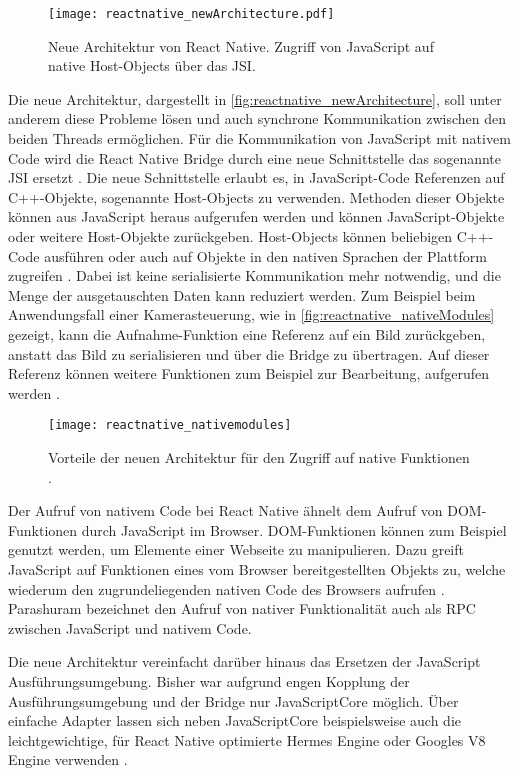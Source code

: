 \begin{figure}[ht]
  \centering
  \texttt{[image: reactnative\_newArchitecture.pdf]}
  \caption{Neue Architektur von React Native. Zugriff von JavaScript auf native Host-Objects über das \ac{JSI}.}
  \label{fig:reactnative_newArchitecture}
\end{figure}
Die neue Architektur, dargestellt in \autoref{fig:reactnative_newArchitecture}, soll unter anderem diese Probleme lösen und auch synchrone Kommunikation zwischen den beiden Threads ermöglichen.
Für die Kommunikation von JavaScript mit nativem Code wird die React Native Bridge durch eine neue Schnittstelle das sogenannte \ac{JSI} ersetzt \cite{Cook_ReactNativeBridge}.
Die neue Schnittstelle erlaubt es, in JavaScript-Code Referenzen auf C++-Objekte, sogenannte Host-Objects zu verwenden.
Methoden dieser Objekte können aus JavaScript heraus aufgerufen werden und können JavaScript-Objekte oder weitere Host-Objekte zurückgeben.
Host-Objects können beliebigen C++-Code ausführen oder auch auf Objekte in den nativen Sprachen der Plattform zugreifen \cite{Parashuram_React}.
Dabei ist keine serialisierte Kommunikation mehr notwendig, und die Menge der ausgetauschten Daten kann reduziert werden.
Zum Beispiel beim Anwendungsfall einer Kamerasteuerung, wie in \autoref{fig:reactnative_nativeModules} gezeigt, kann die Aufnahme-Funktion eine Referenz auf ein Bild zurückgeben, anstatt das Bild zu serialisieren und über die Bridge zu übertragen.
Auf dieser Referenz können weitere Funktionen zum Beispiel zur Bearbeitung, aufgerufen werden \cite{Parashuram_React}.
\begin{figure}[ht]
  \centering
  \texttt{[image: reactnative\_nativemodules]}
  \caption{Vorteile der neuen Architektur für den Zugriff auf native Funktionen \cite{Parashuram_React}.}
  \label{fig:reactnative_nativeModules}  
\end{figure}
Der Aufruf von nativem Code bei React Native ähnelt dem Aufruf von \ac{DOM}-Funktionen durch JavaScript im Browser.
\ac{DOM}-Funktionen können zum Beispiel genutzt werden, um Elemente einer Webseite zu manipulieren.
Dazu greift JavaScript auf Funktionen eines vom Browser bereitgestellten Objekts zu, welche wiederum den zugrundeliegenden nativen Code des Browsers aufrufen \cite{ReactNative_newArchitecture}.
Parashuram \cite{Parashuram_React} bezeichnet den Aufruf von nativer Funktionalität auch als \ac{RPC} zwischen JavaScript und nativem Code.

Die neue Architektur vereinfacht darüber hinaus das Ersetzen der JavaScript Ausführungsumgebung.
Bisher war aufgrund engen Kopplung der Ausführungsumgebung und der Bridge nur JavaScriptCore möglich.
Über einfache Adapter lassen sich neben JavaScriptCore beispielsweise auch die leichtgewichtige, für React Native optimierte Hermes Engine oder Googles V8 Engine verwenden \cite{Cook_ReactNativeBridge,JSI_Adapter}.



